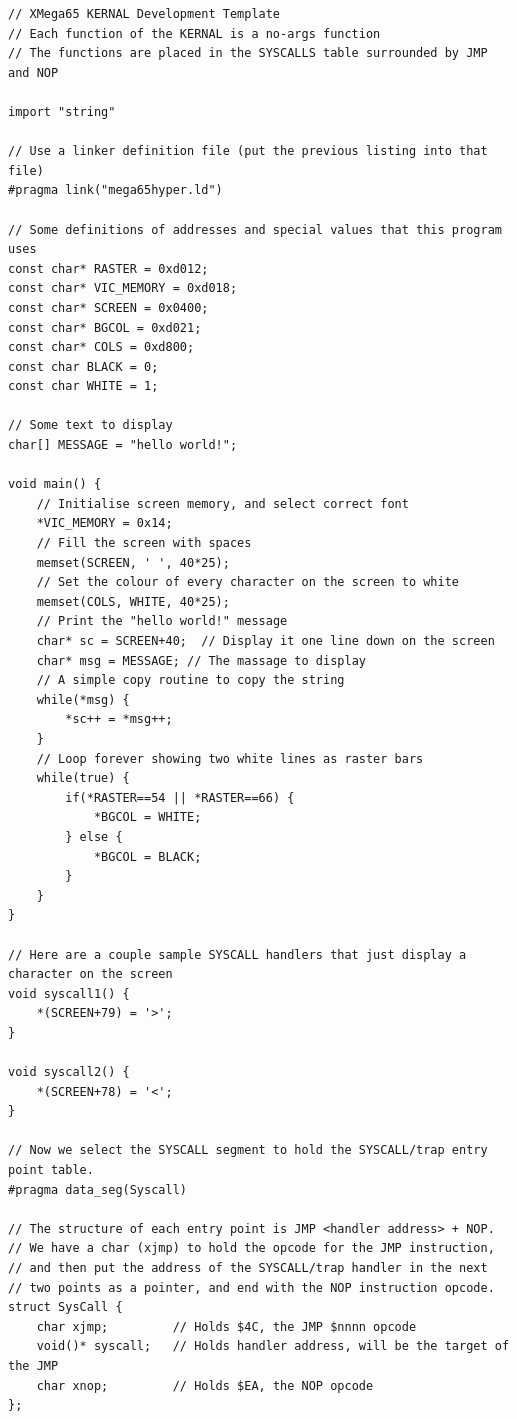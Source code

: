 \begin{tcolorbox}[colback=black,coltext=white]
\verbatimfont{\codefont}
\begin{verbatim}
// XMega65 KERNAL Development Template
// Each function of the KERNAL is a no-args function
// The functions are placed in the SYSCALLS table surrounded by JMP and NOP

import "string"

// Use a linker definition file (put the previous listing into that file)
#pragma link("mega65hyper.ld")

// Some definitions of addresses and special values that this program uses
const char* RASTER = 0xd012;
const char* VIC_MEMORY = 0xd018;
const char* SCREEN = 0x0400;
const char* BGCOL = 0xd021;
const char* COLS = 0xd800;
const char BLACK = 0;
const char WHITE = 1;

// Some text to display
char[] MESSAGE = "hello world!";

void main() {
    // Initialise screen memory, and select correct font
    *VIC_MEMORY = 0x14;
    // Fill the screen with spaces
    memset(SCREEN, ' ', 40*25);
    // Set the colour of every character on the screen to white
    memset(COLS, WHITE, 40*25);
    // Print the "hello world!" message
    char* sc = SCREEN+40;  // Display it one line down on the screen
    char* msg = MESSAGE; // The massage to display
    // A simple copy routine to copy the string
    while(*msg) {
        *sc++ = *msg++;
    }
    // Loop forever showing two white lines as raster bars
    while(true) {
        if(*RASTER==54 || *RASTER==66) {
            *BGCOL = WHITE;
        } else {
            *BGCOL = BLACK;
        }
    }
}

// Here are a couple sample SYSCALL handlers that just display a character on the screen
void syscall1() {
    *(SCREEN+79) = '>';
}

void syscall2() {
    *(SCREEN+78) = '<';
}

// Now we select the SYSCALL segment to hold the SYSCALL/trap entry point table.
#pragma data_seg(Syscall)

// The structure of each entry point is JMP <handler address> + NOP.
// We have a char (xjmp) to hold the opcode for the JMP instruction,
// and then put the address of the SYSCALL/trap handler in the next
// two points as a pointer, and end with the NOP instruction opcode.
struct SysCall {
    char xjmp;         // Holds $4C, the JMP $nnnn opcode
    void()* syscall;   // Holds handler address, will be the target of the JMP
    char xnop;         // Holds $EA, the NOP opcode
};


\end{verbatim}
\end{tcolorbox}
